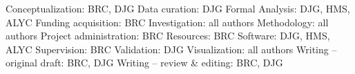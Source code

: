 

Conceptualization: BRC, DJG\newline
Data curation: DJG\newline
Formal Analysis: DJG, HMS, ALYC\newline
Funding acquisition: BRC\newline
Investigation: all authors\newline
Methodology: all authors\newline
Project administration: BRC\newline
Resources: BRC\newline
Software: DJG, HMS, ALYC\newline
Supervision: BRC\newline
Validation: DJG\newline
Visualization: all authors\newline
Writing – original draft: BRC, DJG\newline
Writing – review \& editing: BRC, DJG\newline
















